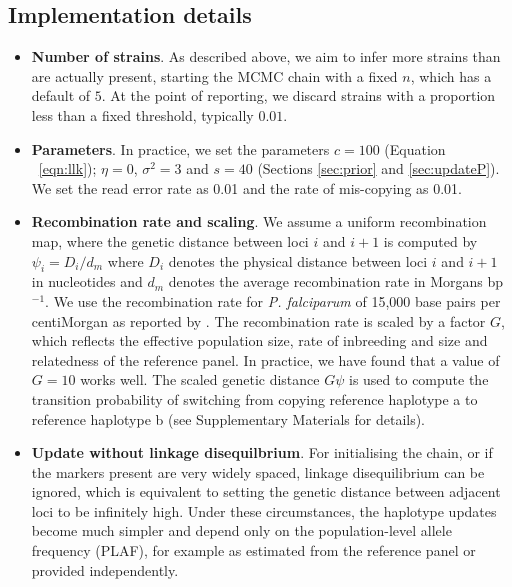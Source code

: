\documentclass{bioinfo}
\begin{document}
\subsection{Implementation details}

\begin{itemize}
\item {\bf Number of strains}. As described above, we aim to infer more strains than are actually present, starting the MCMC chain with a fixed $n$, which has a default of $5$. At the point of reporting, we discard strains with a proportion less than a fixed threshold, typically $0.01$.

\item {\bf Parameters}. In practice, we set the parameters $c=100$ (Equation ~\eqref{eqn:llk}); $\eta = 0$, $\sigma^2 = 3$ and $s=40$ (Sections \ref{sec:prior} and \ref{sec:updateP}).  We set the read error rate as 0.01 and the rate of mis-copying as 0.01.

\item {\bf Recombination rate and scaling}. We assume a uniform recombination map, where the genetic distance between loci $i$ and $i+1$ is computed by $\psi_i = D_i / d_m$ where $D_i$ denotes the physical distance between loci $i$ and $i+1$ in nucleotides and $d_m$ denotes the average recombination rate in Morgans bp$^{-1}$. We use the recombination rate for {\it P. falciparum} of 15,000 base pairs per centiMorgan as reported by \citet{Miles2016}. The recombination rate is scaled by a factor $G$, which reflects the effective population size, rate of inbreeding and size and relatedness of the reference panel.  In practice, we have found that a value of $G=10$ works well.  The scaled genetic distance $G\psi$ is used to compute the transition probability of switching from copying reference haplotype a to reference haplotype b (see Supplementary Materials for details).

\item {\bf Update without linkage disequilbrium}. For initialising the chain, or if the markers present are very widely spaced, linkage disequilibrium can be ignored, which is equivalent to setting the genetic distance between adjacent loci to be infinitely high.  Under these circumstances, the haplotype updates become much simpler and depend only on the population-level allele frequency (PLAF), for example as estimated from the reference panel or provided independently.


\end{itemize}
\end{document}
